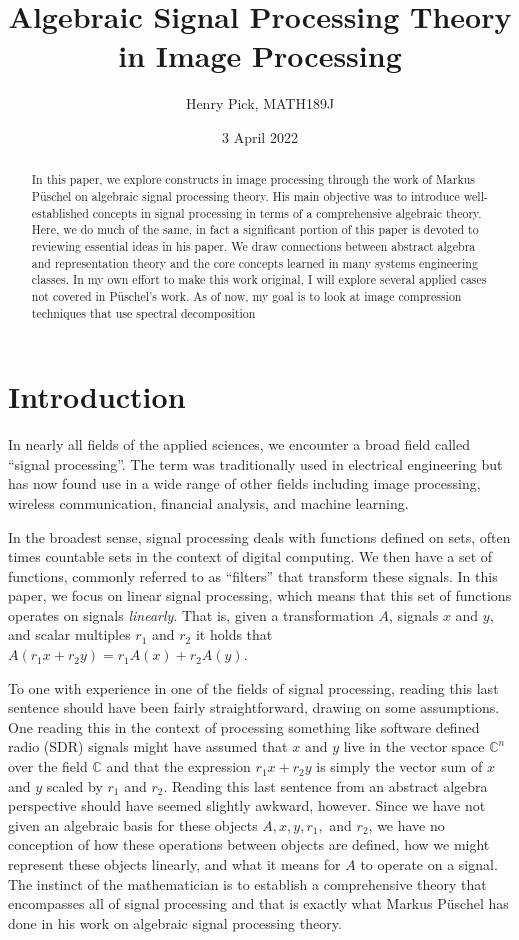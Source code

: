 \documentclass[12pt,technote]{IEEEtran}
\author{Henry Pick, MATH189J}
\title{Algebraic Signal Processing Theory in Image Processing}
\date{3 April 2022}
\begin{document}
\maketitle
\begin{abstract}
    In this paper, we explore constructs in image processing through the work of Markus P\"uschel on algebraic signal processing theory. His main objective was to introduce well-established concepts in signal processing in terms of a comprehensive algebraic theory. Here, we do much of the same, in fact a significant portion of this paper is devoted to reviewing essential ideas in his paper. We draw connections between abstract algebra and representation theory and the core concepts learned in many systems engineering classes. In my own effort to make this work original, I will explore several applied cases not covered in P\"uschel's work. As of now, my goal is to look at image compression techniques that use spectral decomposition
\end{abstract}
\section{Introduction}
In nearly all fields of the applied sciences, we encounter a broad field called ``signal processing''. The term was traditionally used in electrical engineering but has now found use in a wide range of other fields including image processing, wireless communication, financial analysis, and machine learning. 

In the broadest sense, signal processing deals with functions defined on sets, often times countable sets in the context of digital computing. We then have a set of functions, commonly referred to as ``filters'' that transform these signals. In this paper, we focus on linear signal processing, which means that this set of functions operates on signals \textit{linearly}. That is, given a transformation $A$, signals $x$ and $y$, and scalar multiples $r_1$ and $r_2$ it holds that $A(r_1x + r_2y) = r_1A(x) + r_2A(y)$. 

To one with experience in one of the fields of signal processing, reading this last sentence should have been fairly straightforward, drawing on some assumptions. One reading this in the context of processing something like software defined radio (SDR) signals might have assumed that $x$ and $y$ live in the vector space $\mathbb{C}^n$ over the field $\mathbb{C}$ and that the expression $r_1x + r_2y$ is simply the vector sum of $x$ and $y$ scaled by $r_1$ and $r_2$. Reading this last sentence from an abstract algebra perspective should have seemed slightly awkward, however. Since we have not given an algebraic basis for these objects $A, x, y, r_1,$ and $r_2$, we have no conception of how these operations between objects are defined, how we might represent these objects linearly, and what it means for $A$ to operate on a signal. The instinct of the mathematician is to establish a comprehensive theory that encompasses all of signal processing and that is exactly what Markus P\"uschel has done in his work on algebraic signal processing theory\cite{AlgebraicSignalProcessing2006}.
\end{document}
